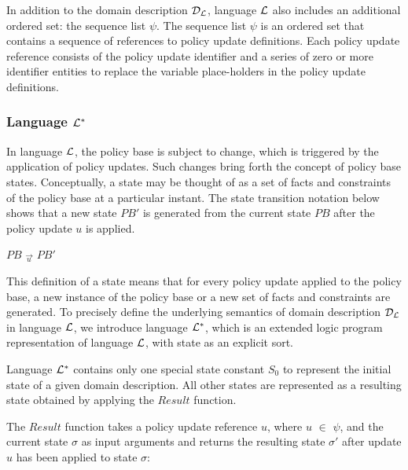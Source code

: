 \documentclass[11pt, twocolumn]{article}
\newenvironment{vquote}
  {\begin{list}{}{\leftmargin 1em}\item[]}
  {\end{list}}
\begin{document}
        In addition to the domain description ${\cal D}_{\cal L}$, language
        ${\cal L}$ also includes an additional ordered set: the sequence list
        $\psi$. The sequence list $\psi$ is an ordered set that contains a
        sequence of references to policy update definitions. Each policy update
        reference consists of the policy update identifier and a series of zero
        or more identifier entities to replace the variable place-holders in
        the policy update definitions.

      \subsubsection{Language ${\cal L}^{*}$}

        In language ${\cal L}$, the policy base is subject to change, which is
        triggered by the application of policy updates. Such changes bring
        forth the concept of policy base states. Conceptually, a state may be
        thought of as a set of facts and constraints of the policy base at a
        particular instant. The state transition notation below shows that a
        new state $PB'$ is generated from the current state $PB$ after the
        policy update $u$ is applied.

        \begin{vquote}
          $PB$ $\overrightarrow{_{u}}$ $PB'$
        \end{vquote}

        This definition of a state means that for every policy update applied
        to the policy base, a new instance of the policy base or a new set of
        facts and constraints are generated. To precisely define the underlying
        semantics of domain description ${\cal D}_{\cal L}$ in language
        ${\cal L}$, we introduce language ${\cal L}^{*}$, which is an extended
        logic program representation of language ${\cal L}$, with state as an
        explicit sort.

        Language ${\cal L}^{*}$ contains only one special state constant
        $S_{0}$ to represent the initial state of a given domain description.
        All other states are represented as a resulting state obtained by
        applying the $Result$ function.

        The $Result$ function takes a policy update reference $u$, where $u$
        $\in$ $\psi$, and the current state $\sigma$ as input arguments and
        returns the resulting state $\sigma'$ after update $u$ has been applied
        to state $\sigma$:
\end{document}
